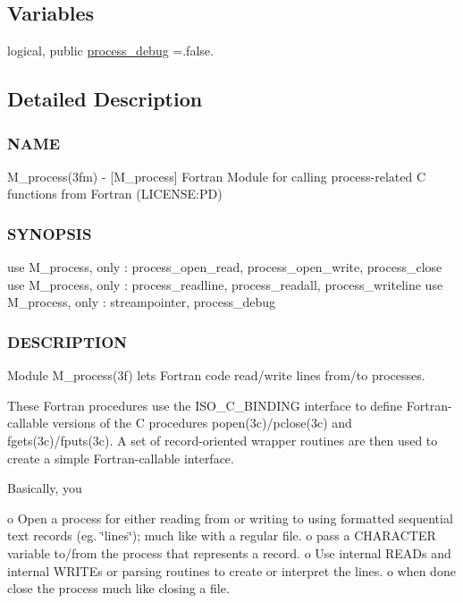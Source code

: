 \subsection*{Variables}
\begin{DoxyCompactItemize}
\item 
logical, public \mbox{\hyperlink{namespacem__process_a0fabee8d01338d5523fbdea5c5f1e894}{process\+\_\+debug}} =.false.
\end{DoxyCompactItemize}


\subsection{Detailed Description}
\subsubsection*{N\+A\+ME}

M\+\_\+process(3fm) -\/ \mbox{[}M\+\_\+process\mbox{]} Fortran Module for calling process-\/related C functions from Fortran (L\+I\+C\+E\+N\+SE\+:PD) 

\subsubsection*{S\+Y\+N\+O\+P\+S\+IS}

\begin{DoxyVerb}use M_process, only : process_open_read, process_open_write, process_close
use M_process, only : process_readline, process_readall, process_writeline
use M_process, only : streampointer, process_debug
\end{DoxyVerb}


\subsubsection*{D\+E\+S\+C\+R\+I\+P\+T\+I\+ON}

Module M\+\_\+process(3f) lets Fortran code read/write lines from/to processes.

These Fortran procedures use the I\+S\+O\+\_\+\+C\+\_\+\+B\+I\+N\+D\+I\+NG interface to define Fortran-\/callable versions of the C procedures popen(3c)/pclose(3c) and fgets(3c)/fputs(3c). A set of record-\/oriented wrapper routines are then used to create a simple Fortran-\/callable interface.

Basically, you

o Open a process for either reading from or writing to using formatted sequential text records (eg. \char`\"{}lines\char`\"{}); much like with a regular file. o pass a C\+H\+A\+R\+A\+C\+T\+ER variable to/from the process that represents a record. o Use internal R\+E\+A\+Ds and internal W\+R\+I\+T\+Es or parsing routines to create or interpret the lines. o when done close the process much like closing a file.


